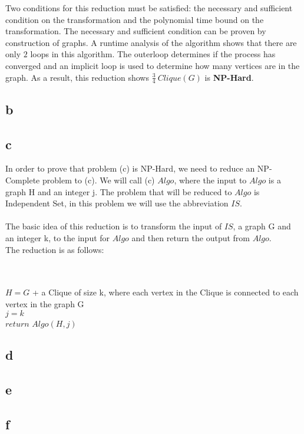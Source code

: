 \documentclass[12pt]{article}
\begin{document}
Two conditions for this reduction must be satisfied: the necessary and sufficient
condition on the transformation and the polynomial time bound on the transformation.
The necessary and sufficient condition can be proven by construction of graphs.  A
runtime analysis of the algorithm shows that there are only $2$ loops in this 
algorithm.  The outerloop determines if the process has converged and an implicit
loop is used to determine how many vertices are in the graph.  As a result, this
reduction shows $\frac{3}{4}\ Clique(G)$ is \textbf{NP-Hard}. 
\subsection*{b}
\subsection*{c}
In order to prove that problem (c) is NP-Hard, we need to reduce an NP-Complete problem to (c). We will call (c) {$Algo$}, where the input to {$Algo$} is a graph H and an integer j. The problem that will be reduced to {$Algo$} is Independent Set, in this problem we will use the abbreviation {$IS$}.\\\\
The basic idea of this reduction is to transform the input of {$IS$}, a graph G and an integer k, to the input for {$Algo$} and then return the output from {$Algo$}.\\
The reduction is as follows: \\\\
\begin{algorithm}[H]
\\
{$H =  G$ + a Clique of size k, where each vertex in the Clique is connected to each vertex in the graph G}\\
{$j = k$}\\
{$return$  $Algo(H, j)$}
\end{algorithm}
\subsection*{d}
\subsection*{e}
\subsection*{f}
\end{document}
